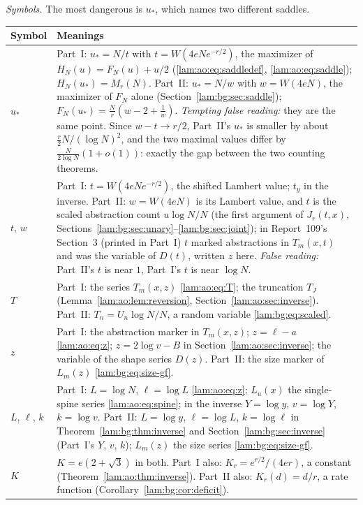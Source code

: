 \documentclass[11pt,a4paper]{article}
\numberwithin{equation}{section}
\theoremstyle{remark}
\begin{document}
\emph{Symbols.} The most dangerous is $u_*$, which names two different saddles.
\begingroup\small
\begin{longtable}{@{}>{\raggedright\arraybackslash}p{} >{\raggedright\arraybackslash}p{}@{}}
\toprule
Symbol & Meanings\\
\midrule
\endhead
$u_*$ & Part~I: $u_*=N/t$ with $t=W(4eNe^{-r/2})$, the maximizer of $H_N(u)=F_N(u)+u/2$ (\eqref{lam:ao:eq:saddledef}, \eqref{lam:ao:eq:saddle}); $H_N(u_*)=M_r(N)$. Part~II: $u_*=N/w$ with $w=W(4eN)$, the maximizer of $F_N$ alone (Section~\ref{lam:bg:sec:saddle}); $F_N(u_*)=\frac Nr(w-2+\frac1w)$. \emph{Tempting false reading:} they are the same point. Since $w-t\to r/2$, Part~II's $u_*$ is smaller by about $\frac r2N/(\log N)^2$, and the two maximal values differ by $\frac N{2\log N}(1+o(1))$: exactly the gap between the two counting theorems.\\
$t$, $w$ & Part~I: $t=W(4eNe^{-r/2})$, the shifted Lambert value; $t_y$ in the inverse. Part~II: $w=W(4eN)$ is its Lambert value, and $t$ is the scaled abstraction count $u\log N/N$ (the first argument of $J_r(t,x)$, Sections~\ref{lam:bg:sec:unary}--\ref{lam:bg:sec:joint}); in Report~109's Section~3 (printed in Part~I) $t$ marked abstractions in $T_m(x,t)$ and was the variable of $D(t)$, written $z$ here. \emph{False reading:} Part~II's $t$ is near $1$, Part~I's $t$ is near $\log N$.\\
$T$ & Part~I: the series $T_m(x,z)$ \eqref{lam:ao:eq:T}; the truncation $T_J$ (Lemma~\ref{lam:ao:lem:reversion}, Section~\ref{lam:ao:sec:inverse}). Part~II: $T_n=U_n\log N/N$, a random variable \eqref{lam:bg:eq:scaled}.\\
$z$ & Part~I: the abstraction marker in $T_m(x,z)$; $z=\ell-a$ \eqref{lam:ao:eq:z}; $z=2\log v-B$ in Section~\ref{lam:ao:sec:inverse}; the variable of the shape series $D(z)$. Part~II: the size marker of $L_m(z)$ \eqref{lam:bg:eq:size-gf}.\\
$L$, $\ell$, $k$ & Part~I: $L=\log N$, $\ell=\log L$ \eqref{lam:ao:eq:z}; $L_u(x)$ the single-spine series \eqref{lam:ao:eq:spine}; in the inverse $Y=\log y$, $v=\log Y$, $k=\log v$. Part~II: $L=\log y$, $\ell=\log L$, $k=\log\ell$ in Theorem~\ref{lam:bg:thm:inverse} and Section~\ref{lam:bg:sec:inverse} (Part~I's $Y$, $v$, $k$); $L_m(z)$ the size series \eqref{lam:bg:eq:size-gf}.\\
$K$ & $K=e(2+\sqrt3)$ in both. Part~I also: $K_r=e^{r/2}/(4er)$, a constant (Theorem~\ref{lam:ao:thm:inverse}). Part~II also: $K_r(d)=d/r$, a rate function (Corollary~\ref{lam:bg:cor:deficit}).\\

\end{longtable}
\end{document}
